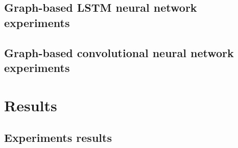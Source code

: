\subsection{Graph-based LSTM neural network experiments}
\subsection{Graph-based convolutional neural network experiments}



\section{Results} \label{sec: results}

\subsection{Experiments results}

